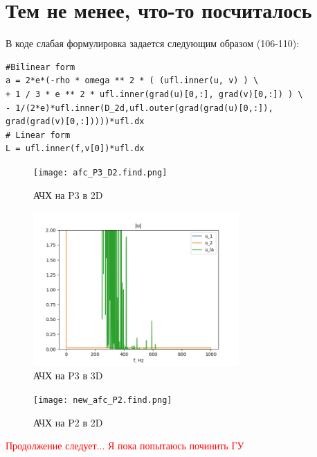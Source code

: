 \documentclass[a4paper,12pt]{article}
\begin{document}
\section{Тем не менее, что-то посчиталось}
В коде слабая формулировка задается следующим образом (106-110):
\begin{lstlisting}
#Bilinear form
a = 2*e*(-rho * omega ** 2 * ( (ufl.inner(u, v) ) \
+ 1 / 3 * e ** 2 * ufl.inner(grad(u)[0,:], grad(v)[0,:]) ) \
- 1/(2*e)*ufl.inner(D_2d,ufl.outer(grad(grad(u)[0,:]),
grad(grad(v)[0,:]))))*ufl.dx
# Linear form
L = ufl.inner(f,v[0])*ufl.dx
\end{lstlisting}

\begin{figure}[H]
	\begin{center}
		\texttt{[image: afc\_P3\_D2.find.png]}
		\caption{АЧХ на P3 в 2D}
	\end{center}
\end{figure}

\begin{figure}[H]
	\begin{center}
		\includegraphics[width = 0.7\textwidth]{afc_P3_D3.png}
		\caption{АЧХ на P3 в 3D}
	\end{center}
\end{figure}

\begin{figure}[H]
	\begin{center}
		\texttt{[image: new\_afc\_P2.find.png]}
		\caption{АЧХ на P2 в 2D}
	\end{center}
\end{figure}


\textcolor{red}{Продолжение следует... Я пока попытаюсь починить ГУ}
\end{document}
